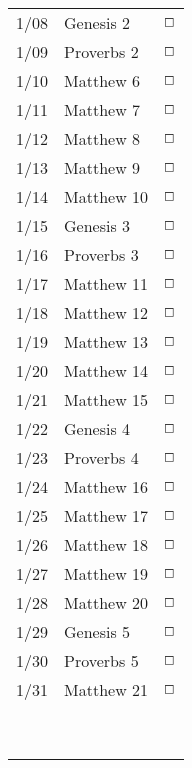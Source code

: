 \documentclass[10pt,landscape,letterpaper]{article}
\begin{document}
\begin{multicols}{5}
\begin{tabular}{p{0.3in}p{0.75in}p{0.4in}}
1/08 & \textcolor[rgb]{0.98,0.00,0.00}{Genesis 2} & \textcolor[rgb]{0.98,0.00,0.00}{$\boxempty$} \\
1/09 & \textcolor[rgb]{0.98,0.00,0.00}{Proverbs 2} & \textcolor[rgb]{0.98,0.00,0.00}{$\boxempty$} \\
1/10 & Matthew 6 & $\boxempty$ \\
1/11 & Matthew 7 & $\boxempty$ \\
1/12 & Matthew 8 & $\boxempty$ \\
1/13 & Matthew 9 & $\boxempty$ \\
1/14 & Matthew 10 & $\boxempty$ \\

1/15 & \textcolor[rgb]{0.98,0.00,0.00}{Genesis 3} & \textcolor[rgb]{0.98,0.00,0.00}{$\boxempty$} \\
1/16 & \textcolor[rgb]{0.98,0.00,0.00}{Proverbs 3} & \textcolor[rgb]{0.98,0.00,0.00}{$\boxempty$} \\
1/17 & Matthew 11 & $\boxempty$ \\
1/18 & Matthew 12 & $\boxempty$ \\
1/19 & Matthew 13 & $\boxempty$ \\
1/20 & Matthew 14 & $\boxempty$ \\
1/21 & Matthew 15 & $\boxempty$ \\

1/22 & \textcolor[rgb]{0.98,0.00,0.00}{Genesis 4} & \textcolor[rgb]{0.98,0.00,0.00}{$\boxempty$} \\
1/23 & \textcolor[rgb]{0.98,0.00,0.00}{Proverbs 4} & \textcolor[rgb]{0.98,0.00,0.00}{$\boxempty$} \\
1/24 & Matthew 16 & $\boxempty$ \\
1/25 & Matthew 17 & $\boxempty$ \\
1/26 & Matthew 18 & $\boxempty$ \\
1/27 & Matthew 19 & $\boxempty$ \\
1/28 & Matthew 20 & $\boxempty$ \\

1/29 & \textcolor[rgb]{0.98,0.00,0.00}{Genesis 5} & \textcolor[rgb]{0.98,0.00,0.00}{$\boxempty$} \\
1/30 & \textcolor[rgb]{0.98,0.00,0.00}{Proverbs 5} & \textcolor[rgb]{0.98,0.00,0.00}{$\boxempty$} \\
1/31 & Matthew 21 & $\boxempty$ \\
 &  &  \\
 &  &  \\
 &  &  \\
 &  &  \\
 &  &  \\
 &  &  \\
 &  &  \\
 &  &  \\
 &  &  \\


\end{tabular}
\end{multicols}
\end{document}
